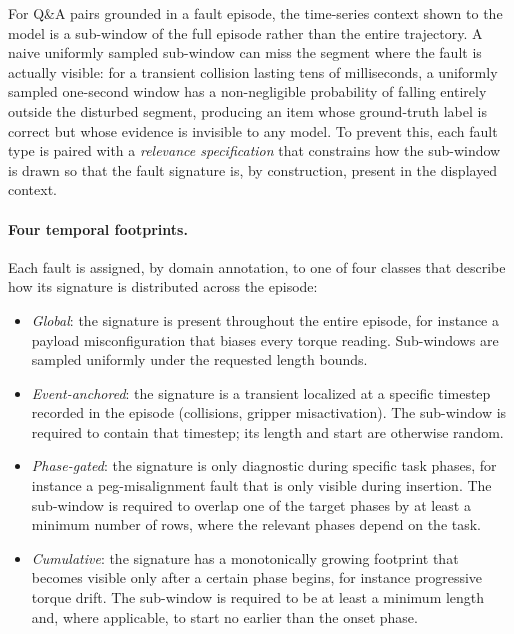 \documentclass{article}
\begin{document}
For Q\&A pairs grounded in a fault episode, the time-series context shown to the model is a sub-window of the full episode rather than the entire trajectory. A naive uniformly sampled sub-window can miss the segment where the fault is actually visible: for a transient collision lasting tens of milliseconds, a uniformly sampled one-second window has a non-negligible probability of falling entirely outside the disturbed segment, producing an item whose ground-truth label is correct but whose evidence is invisible to any model. To prevent this, each fault type is paired with a \emph{relevance specification} that constrains how the sub-window is drawn so that the fault signature is, by construction, present in the displayed context.

\paragraph{Four temporal footprints.} Each fault is assigned, by domain annotation, to one of four classes that describe how its signature is distributed across the episode:

\begin{itemize}
    \item \emph{Global}: the signature is present throughout the entire episode, for instance a payload misconfiguration that biases every torque reading. Sub-windows are sampled uniformly under the requested length bounds.
    \item \emph{Event-anchored}: the signature is a transient localized at a specific timestep recorded in the episode (collisions, gripper misactivation). The sub-window is required to contain that timestep; its length and start are otherwise random.
    \item \emph{Phase-gated}: the signature is only diagnostic during specific task phases, for instance a peg-misalignment fault that is only visible during insertion. The sub-window is required to overlap one of the target phases by at least a minimum number of rows, where the relevant phases depend on the task.
    \item \emph{Cumulative}: the signature has a monotonically growing footprint that becomes visible only after a certain phase begins, for instance progressive torque drift. The sub-window is required to be at least a minimum length and, where applicable, to start no earlier than the onset phase.
\end{itemize}
\end{document}
